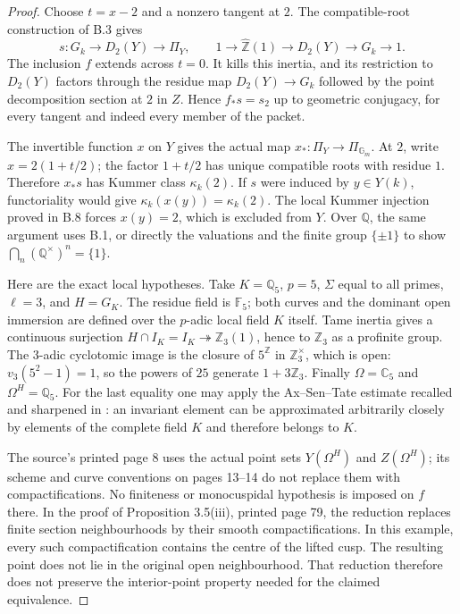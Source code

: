 \begin{proof}
Choose $t=x-2$ and a nonzero tangent at $2$. The compatible-root
construction of B.3 gives
\[
 s:G_k\longrightarrow D_2(Y)\longrightarrow\Pi_Y,
 \qquad
 1\longrightarrow\widehat{\mathbb Z}(1)
 \longrightarrow D_2(Y)\longrightarrow G_k\longrightarrow1.
\]
The inclusion $f$ extends across $t=0$. It kills this inertia,
and its restriction to $D_2(Y)$ factors through the residue
map $D_2(Y)\to G_k$ followed by the point decomposition
section at $2$ in $Z$. Hence $f_*s=s_2$ up to geometric
conjugacy, for every tangent and indeed every member of
the packet.

The invertible function $x$ on $Y$ gives the actual map
$x_*:\Pi_Y\to\Pi_{\mathbb G_m}$.
At $2$, write $x=2(1+t/2)$; the factor $1+t/2$ has unique
compatible roots with residue $1$. Therefore $x_*s$ has
Kummer class $\kappa_k(2)$. If $s$ were induced by
$y\in Y(k)$, functoriality would give
$\kappa_k(x(y))=\kappa_k(2)$.
The local Kummer injection proved in B.8 forces $x(y)=2$,
which is excluded from $Y$. Over $\mathbb Q$, the same
argument uses B.1, or directly the valuations and the
finite group $\{\pm1\}$ to show
$\bigcap_n(\mathbb Q^\times)^n=\{1\}$.

Here are the exact local hypotheses. Take $K=\mathbb Q_5$,
$p=5$, $\Sigma$ equal to all primes, $\ell=3$, and
$H=G_K$. The residue field is $\mathbb F_5$; both curves
and the dominant open immersion are defined over the
$p$-adic local field $K$ itself. Tame inertia gives a
continuous surjection $H\cap I_K=I_K\twoheadrightarrow
\mathbb Z_3(1)$, hence to $\mathbb Z_3$ as a profinite
group. The $3$-adic cyclotomic image is the closure of
$5^{\mathbb Z}$ in $\mathbb Z_3^\times$, which is open:
$v_3(5^2-1)=1$, so the powers of $25$ generate
$1+3\mathbb Z_3$. Finally
$\Omega=\mathbb C_5$ and $\Omega^H=\mathbb Q_5$.
For the last equality one may apply the Ax--Sen--Tate
estimate recalled and sharpened in \cite{B_LeBorgne}:
an invariant element can be approximated arbitrarily
closely by elements of the complete field $K$ and
therefore belongs to $K$.

The source's printed page 8 uses the actual point sets
$Y(\Omega^H)$ and $Z(\Omega^H)$; its scheme and curve
conventions on pages 13--14 do not replace them with
compactifications. No finiteness or monocuspidal hypothesis
is imposed on $f$ there. In the proof of Proposition
3.5(iii), printed page 79, the reduction replaces finite
section neighbourhoods by their smooth compactifications.
In this example, every such compactification contains
the centre of the lifted cusp. The resulting point
does not lie in the original open neighbourhood.
That reduction therefore does not preserve the
interior-point property needed for the claimed equivalence.
\end{proof}

